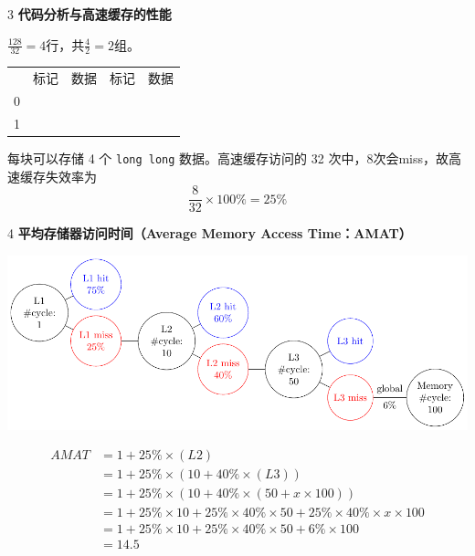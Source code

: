 \documentclass[12pt,a4paper]{article}
\newenvironment{problems}{\begin{list}{}{\renewcommand{\makelabel}[1]{\textbf{##1}.\hfil}}}{\end{list}}
\begin{document}
\begin{problems}
    \item[3] \textbf{代码分析与高速缓存的性能}
    
    $\frac{128}{32}=4$行，共$\frac{4}{2}=2$组。

    \begin{tabular}{c|c|c|c|c|}
        \cline{2-5}
        & 标记 & 数据 & 标记 & 数据 \\
        \cline{2-5}
        0 & & & & \\
        \cline{2-5}
        1 & & & & \\
        \cline{2-5}
    \end{tabular}

    每块可以存储 4 个 \verb"long long" 数据。高速缓存访问的 32 次中，8次会miss，故高速缓存失效率为
    \begin{equation*}
        \frac{8}{32}\times 100 \% = 25\%
    \end{equation*}
    
    \item[4] \textbf{平均存储器访问时间（Average Memory Access Time：AMAT）}
     
    \includegraphics[width=\textwidth]{cache.pdf}

    \begin{align*}
        \mathit{AMAT}&=1+25\%\times (L2)\\
                    &=1+25\%\times (10+40\%\times (L3))\\
                    &=1+25\%\times(10+40\%\times(50+x\times 100))\\
                    &=1+25\%\times 10 + 25\%\times 40\% \times 50 + 25\%\times 40\% \times x\times 100\\
                    &=1+25\%\times 10 + 25\%\times 40\% \times 50 + 6\%\times 100\\
                    &=14.5
    \end{align*}


\end{problems}
\end{document}
